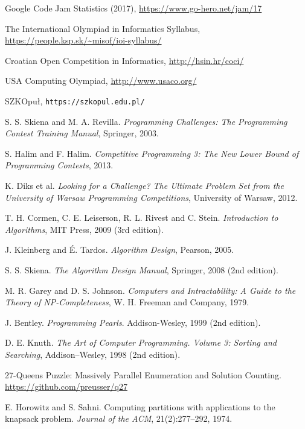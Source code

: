 \begin{thebibliography}{9}

    Google Code Jam Statistics (2017),
    \url{https://www.go-hero.net/jam/17}
  
    The International Olympiad in Informatics Syllabus,
    \url{https://people.ksp.sk/~misof/ioi-syllabus/}
  
    Croatian Open Competition in Informatics, \url{http://hsin.hr/coci/}
  
    USA Computing Olympiad, \url{http://www.usaco.org/}
  
    SZKOpuł, \texttt{https://szkopul.edu.pl/}
  
    S. S. Skiena and M. A. Revilla.
    \emph{Programming Challenges: The Programming Contest Training Manual},
    Springer, 2003.
  
    S. Halim and F. Halim.
    \emph{Competitive Programming 3: The New Lower Bound of Programming Contests}, 2013.
  
    K. Diks et al.
    \emph{Looking for a Challenge? The Ultimate Problem Set from
    the University of Warsaw Programming Competitions}, University of Warsaw, 2012.
  
    T. H. Cormen, C. E. Leiserson, R. L. Rivest and C. Stein.
    \emph{Introduction to Algorithms}, MIT Press, 2009 (3rd edition).
  
    J. Kleinberg and É. Tardos.
    \emph{Algorithm Design}, Pearson, 2005.
  
    S. S. Skiena.
    \emph{The Algorithm Design Manual}, Springer, 2008 (2nd edition).
  
    M. R. Garey and D. S. Johnson.
    \emph{Computers and Intractability:
    A Guide to the Theory of NP-Completeness},
    W. H. Freeman and Company, 1979.
  
    J. Bentley.
    \emph{Programming Pearls}.
    Addison-Wesley, 1999 (2nd edition).
  
    D. E. Knuth.
    \emph{The Art of Computer Programming. Volume 3: Sorting and Searching}, Addison–Wesley, 1998 (2nd edition).
  
    27-Queens Puzzle: Massively Parallel Enumeration and Solution Counting.
    \url{https://github.com/preusser/q27}
  
    E. Horowitz and S. Sahni.
    Computing partitions with applications to the knapsack problem.
    \emph{Journal of the ACM}, 21(2):277--292, 1974.
  

\end{thebibliography}
